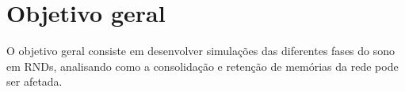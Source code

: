 \section{Objetivo geral}

O objetivo geral consiste em desenvolver simulações das diferentes fases do sono em RNDs, analisando como a consolidação e
retenção de memórias da rede pode ser afetada.
